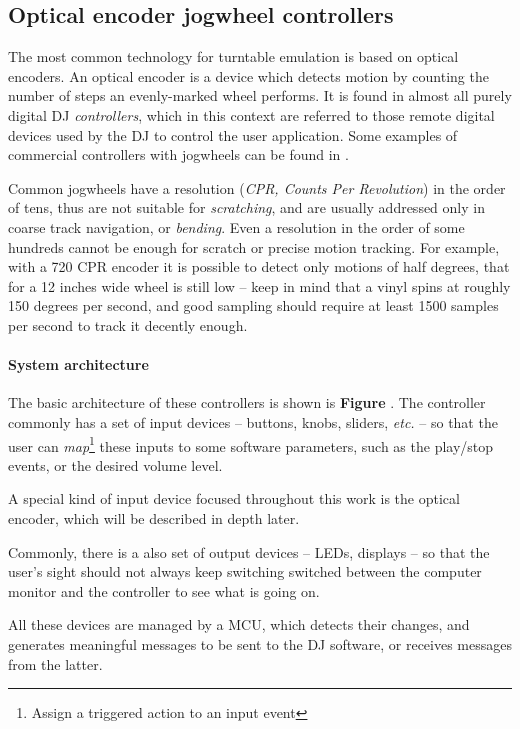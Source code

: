 \documentclass[a4paper,10pt]{article}
\begin{document}
\begin{multicols}{2}
\subsection{Optical encoder jogwheel controllers}

The most common technology for turntable emulation is based on optical encoders.
An optical encoder is a device which detects motion by counting the number of
steps an evenly-marked wheel performs. It is found in almost all purely digital
DJ \emph{controllers}, which in this context are referred to those remote
digital devices used by the DJ to control the user application. Some examples
of commercial controllers with jogwheels can be found in \CITEME.

Common jogwheels have a resolution (\emph{CPR, Counts Per Revolution}) in the
order of tens, thus are not suitable for \emph{scratching}\CITEME, and are
usually addressed only in coarse track navigation, or \emph{bending}\CITEME.
Even a resolution in the order of some hundreds cannot be enough for scratch
or precise motion tracking. For example, with a 720 CPR encoder it is possible
to detect only motions of half degrees, that for a 12 inches wide wheel is
still low -- keep in mind that a vinyl spins at roughly 150 degrees per second,
and good sampling should require at least 1500 samples per second to track it
decently enough.


\paragraph{System architecture}
The basic architecture of these controllers is shown is \textbf{Figure \CITEME}.
The controller commonly has a set of input devices -- buttons, knobs,
sliders, \textit{etc.} -- so that the user can \emph{map}\footnote{
	Assign a triggered action to an input event
} these inputs to some software parameters, such as the play/stop events, or
the desired volume level.

A special kind of input device focused throughout this work is the optical
encoder, \TODO which will be described in depth later.

Commonly, there is a also set of output devices -- LEDs, displays -- so that
the user's sight should not always keep switching switched between the computer
monitor and the controller to see what is going on.

All these devices are managed by a MCU, which detects their changes, and
generates meaningful messages to be sent to the DJ software, or receives
messages from the latter.


\end{multicols}
\end{document}
